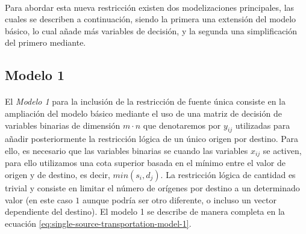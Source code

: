 \documentclass[a4paper, spanish]{article}
\begin{document}
    \paragraph{}
    Para abordar esta nueva restricción existen dos modelizaciones principales, las cuales se describen a continuación, siendo la primera una extensión del modelo básico, lo cual añade más variables de decisión, y la segunda una simplificación del primero mediante.

    \subsection{Modelo 1}
    \label{sec:approach-1}

      \paragraph{}
      El \emph{Modelo 1} para la inclusión de la restricción de fuente única consiste en la ampliación del modelo básico mediante el uso de una matriz de decisión de variables binarias de dimensión $m \cdot n$ que denotaremos por $y_{ij}$ utilizadas para añadir posteriormente la restricción lógica de un único origen por destino. Para ello, es necesario que las variables binarias se  cuando las variables $x_{ij}$ se activen, para ello utilizamos una cota superior basada en el mínimo entre el valor de origen y de destino, es decir, $min(s_{i}, d_{j})$. La restricción lógica de cantidad es trivial y consiste en limitar el número de orígenes por destino a un determinado valor (en este caso $1$ aunque podría ser otro diferente, o incluso un vector dependiente del destino). El modelo 1 se describe de manera completa en la ecuación \eqref{eq:single-source-transportation-model-1}.
\end{document}
